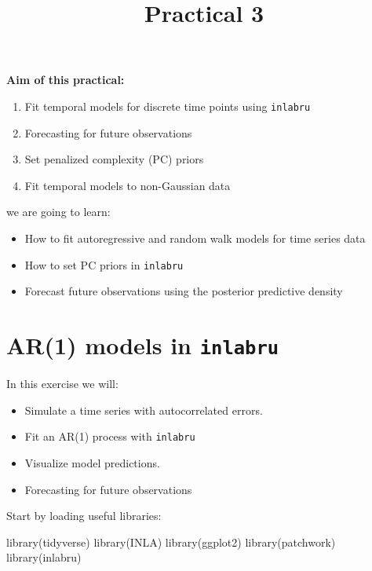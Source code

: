 \documentclass[
  letterpaper,
  DIV=11,
  numbers=noendperiod]{scrartcl}
\title{Practical 3}
\author{}
\date{}
\makeatletter
\newenvironment{Shaded}{\begin{snugshade}}{\end{snugshade}}
\newcommand{\FunctionTok}[1]{\textcolor[rgb]{0.28,0.35,0.67}{#1}}
\newcommand{\NormalTok}[1]{\textcolor[rgb]{0.00,0.23,0.31}{#1}}
\providecommand{\tightlist}{%
  \setlength{\itemsep}{0pt}\setlength{\parskip}{0pt}}
\renewcommand{\maketitle}{\bgroup\setlength{\parindent}{0pt}
\begin{flushleft}
  {\sffamily\huge\textbf{\MakeUppercase{\@title}}} \vspace{0.3cm} \newline
  {\Large {\@subtitle}} \newline
  \@author
\end{flushleft}\egroup
}
\makeatother
\begin{document}
\maketitle

\pagestyle{mystyle}


\textbf{Aim of this practical:}

\begin{enumerate}
\def\labelenumi{\arabic{enumi}.}
\tightlist
\item
  Fit temporal models for discrete time points using \texttt{inlabru}
\item
  Forecasting for future observations
\item
  Set penalized complexity (PC) priors
\item
  Fit temporal models to non-Gaussian data
\end{enumerate}

we are going to learn:

\begin{itemize}
\tightlist
\item
  How to fit autoregressive and random walk models for time series data
\item
  How to set PC priors in \texttt{inlabru}
\item
  Forecast future observations using the posterior predictive density
\end{itemize}

\section{\texorpdfstring{AR(1) models in
\texttt{inlabru}}{AR(1) models in inlabru}}\label{ar1-models-in-inlabru}

In this exercise we will:

\begin{itemize}
\item
  Simulate a time series with autocorrelated errors.
\item
  Fit an AR(1) process with \texttt{inlabru}
\item
  Visualize model predictions.
\item
  Forecasting for future observations
\end{itemize}

Start by loading useful libraries:

\begin{Shaded}
\begin{Highlighting}[]
\FunctionTok{library}\NormalTok{(tidyverse)}
\FunctionTok{library}\NormalTok{(INLA)}
\FunctionTok{library}\NormalTok{(ggplot2)}
\FunctionTok{library}\NormalTok{(patchwork)}
\FunctionTok{library}\NormalTok{(inlabru)     }
\end{Highlighting}
\end{Shaded}
\end{document}
